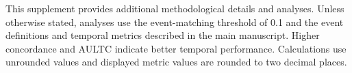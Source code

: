 \label{ch08:supp:material}


This supplement provides additional methodological details and analyses. Unless otherwise stated, analyses use the event-matching threshold of 0.1 and the event definitions and temporal metrics described in the main manuscript. Higher concordance and AULTC indicate better temporal performance. Calculations use unrounded values and displayed metric values are rounded to two decimal places.

